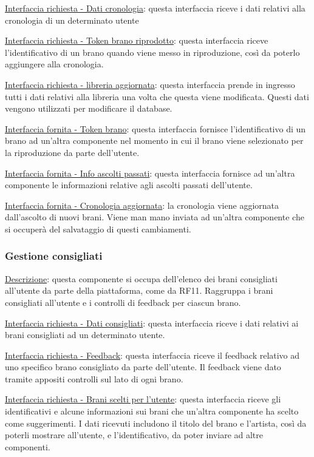 \documentclass[a4paper,12pt]{article}
\begin{document}
\underline{Interfaccia richiesta - Dati cronologia}: questa interfaccia riceve i dati relativi alla cronologia di un determinato utente

\underline{Interfaccia richiesta - Token brano riprodotto}: questa interfaccia riceve l’identificativo di un brano quando viene messo in riproduzione, così da poterlo aggiungere alla cronologia.

\underline{Interfaccia richiesta - libreria aggiornata}: questa interfaccia prende in ingresso tutti i dati relativi alla libreria una volta che questa viene modificata. Questi dati vengono utilizzati per modificare il database.

\underline{Interfaccia fornita - Token brano}: questa interfaccia fornisce l’identificativo di un brano ad un’altra componente nel momento in cui il brano viene selezionato per la riproduzione da parte dell’utente.

\underline{Interfaccia fornita - Info ascolti passati}: questa interfaccia fornisce ad un’altra componente le informazioni relative agli ascolti passati dell’utente.

\underline{Interfaccia fornita - Cronologia aggiornata}: la cronologia viene aggiornata dall’ascolto di nuovi brani. Viene man mano inviata ad un’altra componente che si occuperà del salvataggio di questi cambiamenti.

\subsubsection{Gestione consigliati}

\underline{Descrizione}: questa componente si occupa dell’elenco dei brani consigliati all’utente da parte della piattaforma, come da RF11. Raggruppa i brani consigliati all’utente e i controlli di feedback per ciascun brano.

\underline{Interfaccia richiesta - Dati consigliati}: questa interfaccia riceve i dati relativi ai brani consigliati ad un determinato utente.

\underline{Interfaccia richiesta - Feedback}: questa interfaccia riceve il feedback relativo ad uno specifico brano consigliato da parte dell’utente. Il feedback viene dato tramite appositi controlli sul lato di ogni brano.

\underline{Interfaccia richiesta - Brani scelti per l’utente}: questa interfaccia riceve gli identificativi e alcune informazioni sui brani che un’altra componente ha scelto come suggerimenti. I dati ricevuti includono il titolo del brano e l’artista, così da poterli mostrare all’utente, e l’identificativo, da poter inviare ad altre componenti.
\end{document}
